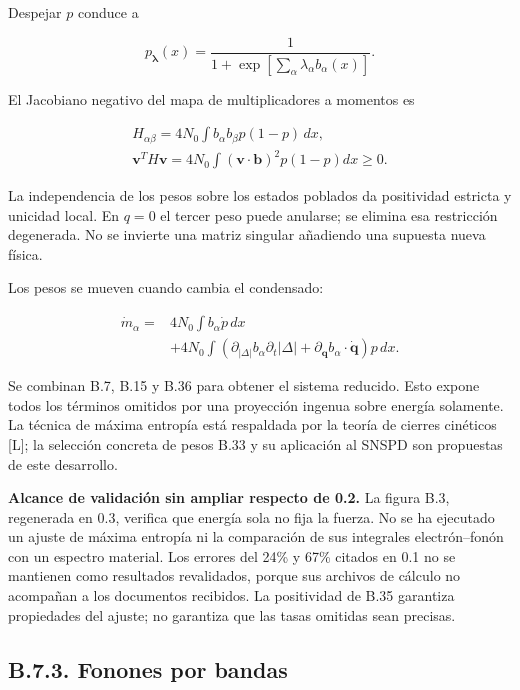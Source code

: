 \documentclass[
  spanish,
  10pt,
  a4paper,
]{article}
\newcounter{none} %
\begin{document}
Despejar \(p\) conduce a

\[
p_{\boldsymbol\lambda}(x)=
\frac1{1+\exp[\sum_\alpha\lambda_\alpha b_\alpha(x)]}. \tag{B.34}
\]

El Jacobiano negativo del mapa de multiplicadores a momentos es

\[
\begin{gathered}
H_{\alpha\beta}=4N_0\int b_\alpha b_\beta p(1-p)\,dx,\\
\mathbf v^TH\mathbf v=4N_0\int(\mathbf v\cdot\mathbf b)^2p(1-p)dx\geq0.
\end{gathered} \tag{B.35}
\]

La independencia de los pesos sobre los estados poblados da positividad
estricta y unicidad local. En \(q=0\) el tercer peso puede anularse; se
elimina esa restricción degenerada. No se invierte una matriz singular
añadiendo una supuesta nueva física.

Los pesos se mueven cuando cambia el condensado:

\[
\begin{aligned}
\dot m_\alpha={}&4N_0\int b_\alpha\dot p\,dx\\
&+4N_0\int(\partial_{|\Delta|}b_\alpha\partial_t|\Delta|+
\partial_{\mathbf q}b_\alpha\cdot\dot{\mathbf q})p\,dx.
\end{aligned}\tag{B.36}
\]

Se combinan B.7, B.15 y B.36 para obtener el sistema reducido. Esto
expone todos los términos omitidos por una proyección ingenua sobre
energía solamente. La técnica de máxima entropía está respaldada por la
teoría de cierres cinéticos {[}L{]}; la selección concreta de pesos B.33
y su aplicación al SNSPD son propuestas de este desarrollo.

\textbf{Alcance de validación sin ampliar respecto de 0.2.} La figura
B.3, regenerada en 0.3, verifica que energía sola no fija la fuerza. No
se ha ejecutado un ajuste de máxima entropía ni la comparación de sus
integrales electrón--fonón con un espectro material. Los errores del
24\% y 67\% citados en 0.1 no se mantienen como resultados revalidados,
porque sus archivos de cálculo no acompañan a los documentos recibidos.
La positividad de B.35 garantiza propiedades del ajuste; no garantiza
que las tasas omitidas sean precisas.

\subsection{B.7.3. Fonones por bandas}\label{b.7.3.-fonones-por-bandas}
\end{document}
